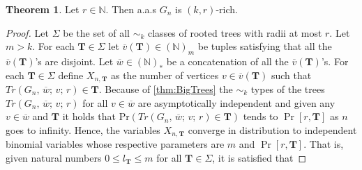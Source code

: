 \documentclass[12pt,notitlepage,a4paper]{article}
\theoremstyle{definition}
\newtheorem{theorem}{Theorem}[section]
\newcommand{\N}{\mathbb{N}}
\begin{document}
\begin{theorem}\label{thm:rich}
	Let $r\in \N$. Then a.a.s $G_n$ is $(k,r)$-rich.
\end{theorem}
\begin{proof}
	Let $\Sigma$ be the set of all $\sim_k$ classes of rooted trees
	with radii at most $r$. Let $m>k$. 
	For each $\mathbf{T}\in \Sigma$
	let $\overline{v}(\mathbf{T})\in (\N)_m$ be tuples
	satisfying 
	that all the $\overline{v}(\mathbf{T})$'s are
	disjoint. Let $\overline{w}\in (\N)_*$ be a concatenation
	of all the $\overline{v}(\mathbf{T})$'s. 
	For each $\mathbf{T}\in 
	\Sigma$ define $X_{n,\mathbf{T}}$ as the number of
	vertices $v\in \overline{v}(\mathbf{T})$ such that 
	$Tr(G_n,\,\overline{w};\,v;\,r)\in \mathbf{T}$. Because of \cref{thm:BigTrees}
	the $\sim_k$ types of the trees $Tr(G_n,\,\overline{w};\,v;\,r)$ 
	for all $v\in \overline{w}$ are asymptotically 
	independent and given any $v\in \overline{w}$ and
	$\mathbf{T}$ it holds that $\mathrm{Pr}(Tr(G_n,\,\overline{w};\,v;\,r)\in \mathbf{T})$
	tends to $\Pr[r,\mathbf{T}]$ as $n$ goes to infinity. 
	Hence,	the variables $X_{n,\mathbf{T}}$ converge in distribution to 
	independent binomial variables whose respective parameters are
	$m$ and $\Pr[r,\mathbf{T}]$. That is, given natural numbers
	$0\leq l_\mathbf{T} \leq m$ for all $\mathbf{T}\in \Sigma$, it is
	satisfied that


\end{proof}
\end{document}

